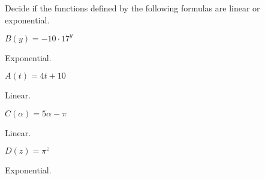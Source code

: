 %
%
\begin{exercises}
\begin{problem}
Decide if the functions defined by the following formulas are linear or exponential.
\begin{multicols}{4}
	\begin{subproblem}
		$B(y)=-10\cdot 17^y$
		\begin{shortsolution}
			Exponential.
		\end{shortsolution}
	\end{subproblem}
	\begin{subproblem}
		$A(t)=4t+10$
		\begin{shortsolution}
			Linear.
		\end{shortsolution}
	\end{subproblem}
	\begin{subproblem}
		$C(\alpha) = 5\alpha-\pi$
		\begin{shortsolution}
			Linear.
		\end{shortsolution}
	\end{subproblem}
	\begin{subproblem}
		$D(z)=\pi^z$
		\begin{shortsolution}
			Exponential.
		\end{shortsolution}
	\end{subproblem}
\end{multicols}
\end{problem}
			

\end{exercises}
